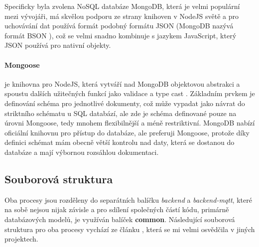 Specificky byla zvolena NoSQL databáze MongoDB, která je velmi populární mezi vývojáři, má skvělou podporu ze strany knihoven v NodeJS světě a pro uchovávání dat používá formát podobný formátu JSON (MongoDB nazývá formát BSON \cite{bson-vs-json}), což se velmi snadno kombinuje s jazykem JavaScript, který JSON používá pro nativní objekty.

\paragraph{Mongoose} je knihovna pro NodeJS, která vytváří nad MongoDB objektovou abstrakci a spoustu dalších užitečných funkcí jako validace a type cast \cite{mongoose}. Základním prvkem je definování schéma pro jednotlivé dokumenty, což může vypadat jako návrat do striktního schématu u SQL databází, ale zde je schéma definované pouze na úrovni Mongoose, tedy mnohem flexibilnější a méně restriktivní. MongoDB nabízí oficiální knihovnu pro přístup do databáze, ale preferuji Mongoose, protože díky definici schémat mám obecně větší kontrolu nad daty, která se dostanou do databáze a mají výbornou rozsáhlou dokumentaci.

\subsection{Souborová struktura}
Oba procesy jsou rozděleny do separátních balíčku \textit{backend} a \textit{backend-mqtt}, které na sobě nejsou nijak závisle a pro sdílení společných částí kódu, primárně databázových modelů, je využíván balíček \textbf{common}. Následující souborová struktura pro oba procesy vychází ze článku \cite[Bulletproof node.js project architecture]{bolletproof-architecture}, která se mi velmi osvědčila v jiných projektech.



